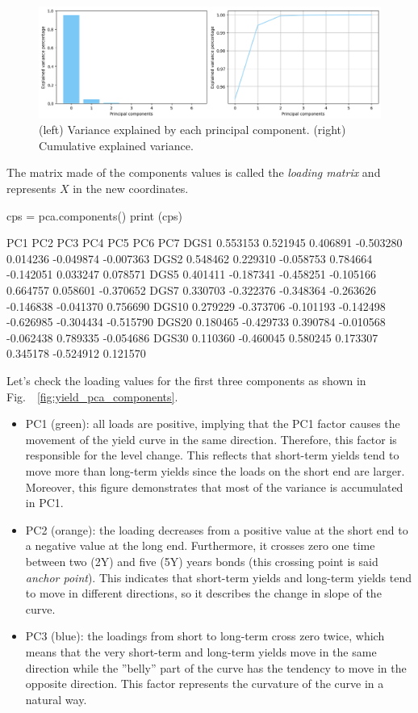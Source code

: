 \begin{figure}[hbtp]
	\centering
	\includegraphics[width=0.8\linewidth]{figures/pca_explained_variance}
	\caption{(left) Variance explained by each principal component. (right) Cumulative explained variance.}
	\label{fig:pca_explained_variance}
\end{figure}

The matrix made of the components values is called the \emph{loading matrix} and represents $X$ in the new coordinates.

\begin{ipython}
cps = pca.components()
print (cps)
\end{ipython}
\begin{ioutput}
            PC1       PC2       PC3       PC4       PC5       PC6       PC7
DGS1   0.553153  0.521945  0.406891 -0.503280  0.014236 -0.049874 -0.007363
DGS2   0.548462  0.229310 -0.058753  0.784664 -0.142051  0.033247  0.078571
DGS5   0.401411 -0.187341 -0.458251 -0.105166  0.664757  0.058601 -0.370652
DGS7   0.330703 -0.322376 -0.348364 -0.263626 -0.146838 -0.041370  0.756690
DGS10  0.279229 -0.373706 -0.101193 -0.142498 -0.626985 -0.304434 -0.515790
DGS20  0.180465 -0.429733  0.390784 -0.010568 -0.062438  0.789335 -0.054686
DGS30  0.110360 -0.460045  0.580245  0.173307  0.345178 -0.524912  0.121570
\end{ioutput}

Let's check the loading values for the first three components as shown in Fig.~~\ref{fig:yield_pca_components}.
 
\begin{itemize}
\item PC1 (green): all loads are positive, implying that the PC1 factor causes the movement of the yield curve in the same direction. Therefore, this factor is responsible for the level change. This reflects that short-term yields tend to move more than long-term yields since the loads on the short end are larger. Moreover, this figure demonstrates that most of the variance is accumulated in PC1.
\item PC2 (orange): the loading decreases from a positive value at the short end to a negative value at the long end. Furthermore, it crosses zero one time between two (2Y) and five (5Y) years bonds (this crossing point is said \emph{anchor point}). This indicates that short-term yields and long-term yields tend to move in different directions, so it describes the change in slope of the curve.
\item PC3 (blue): the loadings from short to long-term cross zero twice, which means that the very short-term and long-term yields move in the same direction while the ”belly” part of the curve has the tendency to move in the opposite direction. This factor represents the curvature of the curve in a natural way.
\end{itemize}
	
